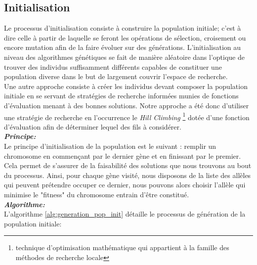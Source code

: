 	\subsection{Initialisation}
	Le processus d'initialisation consiste à construire la population initiale; c'est à dire celle à partir de laquelle se feront les opérations de sélection, croisement ou encore mutation afin de la faire évoluer sur des générations. L'initialisation au niveau des algorithmes génétiques se fait de manière aléatoire dans l'optique de trouver des individus suffisamment différents capables de constituer une population diverse dans le but de largement couvrir l'espace de recherche. \\
	\hspace*{.5cm} Une autre approche consiste à créer les individus devant composer la population initiale en se servant de stratégies de recherche informées munies de fonctions d'évaluation menant à des bonnes solutions. Notre approche a été donc d'utiliser une stratégie de recherche en l’occurrence le \emph{Hill Climbing} \footnote{technique d'optimisation mathématique qui appartient à la famille des méthodes de recherche locale} dotée d'une fonction d'évaluation afin de déterminer lequel des fils à considérer.\\
	\hspace*{.5cm} \textbf{\textsl{Principe:}}\\
	Le principe d'initialisation de la population est le suivant : remplir un chromosome en commençant par le dernier gène et en finissant par le premier. Cela permet de s'assurer de la faisabilité des solutions que nous trouvons au bout du processus. Ainsi, pour chaque gène visité, nous disposons de la liste des allèles qui peuvent prétendre occuper ce dernier, nous pouvons alors choisir l'allèle qui minimise le "fitness" du chromosome entrain d'être constitué.\\
	\hspace*{.5cm} \textbf{\textsl{Algorithme:}}\\	
	L'algorithme \ref{alg:generation_pop_init} détaille le processus de génération de la population initiale: \\
	
